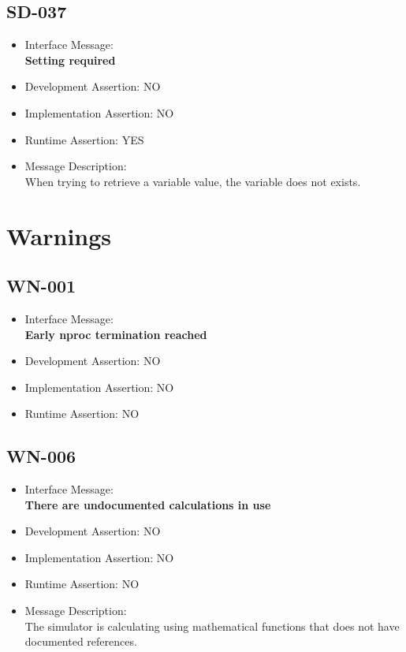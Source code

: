 \subsection{SD-037}
\begin{itemize}
  \item Interface Message:\\[1em]
    \textbf{Setting required}
  \item Development Assertion: NO
  \item Implementation Assertion: NO
  \item Runtime Assertion: YES
  \item Message Description:\\[1em]
    When trying to retrieve a variable value, the variable does not exists.
\end{itemize}

\section{Warnings}

\subsection{WN-001}
\begin{itemize}
  \item Interface Message:\\[1em]
    \textbf{Early nproc termination reached}
  \item Development Assertion: NO
  \item Implementation Assertion: NO
  \item Runtime Assertion: NO
\end{itemize}

\subsection{WN-006}
\begin{itemize}
  \item Interface Message:\\[1em]
    \textbf{There are undocumented calculations in use}
  \item Development Assertion: NO
  \item Implementation Assertion: NO
  \item Runtime Assertion: NO
  \item Message Description:\\[1em]
    The simulator is calculating using mathematical functions that does not have documented references.
\end{itemize}

